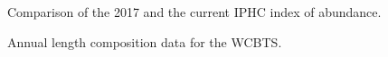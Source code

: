 \documentclass[
]{scrartcl}
\begin{document}
\begin{figure}


\caption{\label{fig-IPHC_comparison}Comparison of the 2017 and the
current IPHC index of abundance.}

\end{figure}%

\begin{figure}


\caption{\label{fig-NWFSC_lencomps}Annual length composition data for
the WCBTS.}

\end{figure}%
\end{document}

